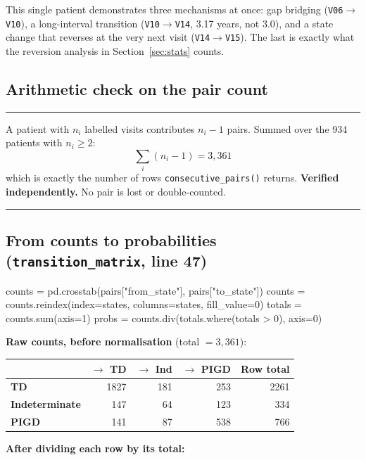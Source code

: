 \documentclass[11pt,a4paper]{article}
\newcommand{\code}[1]{\texttt{\small #1}}
\newcommand{\arr}{$\rightarrow$}
\newenvironment{keypoint}
  {\begin{center}\begin{minipage}{0.95\textwidth}%
   \vspace{4pt}\hrule\vspace{7pt}\small}
  {\vspace{7pt}\hrule\vspace{4pt}\end{minipage}\end{center}}
\begin{document}
\noindent
This single patient demonstrates three mechanisms at once: gap bridging
(\code{V06}\arr\code{V10}), a long-interval transition
(\code{V10}\arr\code{V14}, 3.17 years, not 3.0), and a state change that
reverses at the very next visit (\code{V14}\arr\code{V15}). The last is exactly
what the reversion analysis in Section~\ref{sec:stats} counts.

\subsection{Arithmetic check on the pair count}

\begin{keypoint}
A patient with $n_i$ labelled visits contributes $n_i - 1$ pairs. Summed over
the 934 patients with $n_i \geq 2$:
\[
  \sum_i (n_i - 1) = 3{,}361
\]
which is exactly the number of rows \code{consecutive\_pairs()} returns.
\textbf{Verified independently.} No pair is lost or double-counted.
\end{keypoint}

\subsection{From counts to probabilities \quad (\code{transition\_matrix}, line 47)}

\begin{codeblock}
counts = pd.crosstab(pairs["from_state"], pairs["to_state"])
counts = counts.reindex(index=states, columns=states, fill_value=0)
totals = counts.sum(axis=1)
probs  = counts.div(totals.where(totals > 0), axis=0)
\end{codeblock}

\textbf{Raw counts, before normalisation} (total $= 3{,}361$):

\begin{table}[h]
\centering
\begin{tabular}{@{}lrrr|r@{}}
\toprule
& \textbf{$\rightarrow$ TD} & \textbf{$\rightarrow$ Ind} & \textbf{$\rightarrow$ PIGD} & \textbf{Row total} \\
\midrule
\textbf{TD}            & 1827 & 181 & 253 & 2261 \\
\textbf{Indeterminate} &  147 &  64 & 123 &  334 \\
\textbf{PIGD}          &  141 &  87 & 538 &  766 \\
\bottomrule
\end{tabular}
\end{table}

\textbf{After dividing each row by its total:}
\end{document}
